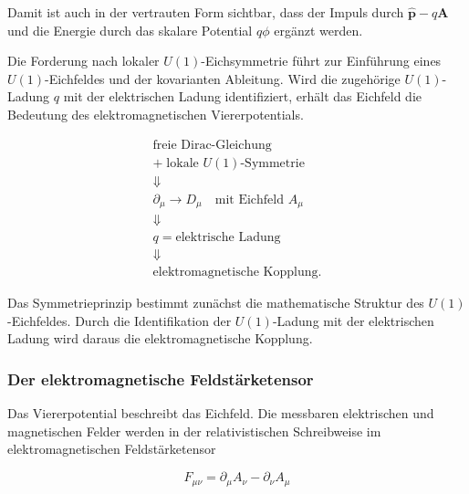 Damit ist auch in der vertrauten Form sichtbar, dass der Impuls durch
\(\hat{\mathbf p}-q\mathbf A\) und die Energie durch das skalare
Potential \(q\phi\) ergänzt werden.

\begin{PhysicsBox}
	\label{box:lokale_symmetrie_bestimmt_kopplung_qed}

	Die Forderung nach lokaler \(U(1)\)-Eichsymmetrie führt zur Einführung
	eines \(U(1)\)-Eichfeldes und der kovarianten Ableitung. Wird die
	zugehörige \(U(1)\)-Ladung \(q\) mit der elektrischen Ladung
	identifiziert, erhält das Eichfeld die Bedeutung des
	elektromagnetischen Viererpotentials.

	\begin{equation*}
		\begin{gathered}
			\text{freie Dirac-Gleichung}
			\\
			+\;\text{lokale }U(1)\text{-Symmetrie}
			\\[4pt]
			\Downarrow
			\\[4pt]
			\partial_\mu\longrightarrow D_\mu
			\quad\text{mit Eichfeld }A_\mu
			\\[4pt]
			\Downarrow
			\\[4pt]
			q=\text{elektrische Ladung}
			\\[4pt]
			\Downarrow
			\\[4pt]
			\text{elektromagnetische Kopplung}.
		\end{gathered}
	\end{equation*}

	Das Symmetrieprinzip bestimmt zunächst die mathematische Struktur des
	\(U(1)\)-Eichfeldes. Durch die Identifikation der \(U(1)\)-Ladung mit
	der elektrischen Ladung wird daraus die elektromagnetische Kopplung.
\end{PhysicsBox}

\subsubsection*{Der elektromagnetische Feldstärketensor}

Das Viererpotential beschreibt das Eichfeld. Die messbaren elektrischen
und magnetischen Felder werden in der relativistischen Schreibweise im
elektromagnetischen Feldstärketensor

\begin{equation}
	F_{\mu\nu}
	=
	\partial_\mu A_\nu
	-
	\partial_\nu A_\mu
	\label{eq:feldstaerketensor_qed}
\end{equation}

